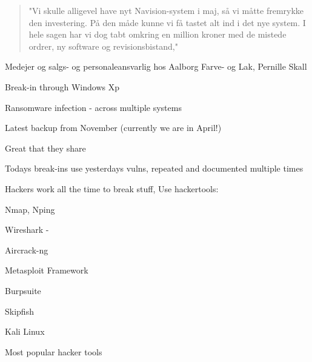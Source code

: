 \documentclass[20pt,landscape,a4paper,footrule]{foils}
\begin{document}

\begin{quote}
"Vi skulle alligevel have nyt Navision-system i maj, så vi måtte fremrykke den investering. På den måde kunne vi få tastet alt ind i det nye system. I hele sagen har vi dog tabt omkring en million kroner med de mistede ordrer, ny software og revisionsbistand,"
\end{quote}
Medejer og salgs- og personaleansvarlig hos Aalborg Farve- og Lak, Pernille Skall

\begin{list1}
\item Break-in through Windows Xp
\item Ransomware infection - across multiple systems
\item Latest backup from November (currently we are in April!)
\item Great that they share
\item Todays break-ins use yesterdays vulns, repeated and documented multiple times
\end{list1}


{\small{}}




\begin{list2}
\item Hackers work all the time to break stuff, Use hackertools:
\item Nmap, Nping 
\item Wireshark - 
\item Aircrack-ng 
\item Metasploit Framework 
\item Burpsuite 
\item Skipfish 
\item Kali Linux 
\end{list2}

\vskip 5mm
\centerline{Most popular hacker tools }


\end{document}
